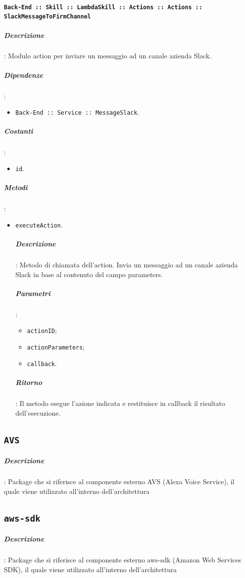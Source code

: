 \documentclass[../DefinizioneDiProdotto_v3.0.0.tex]{subfiles}
\begin{document}
\paragraph{\texttt{Back-End :: Skill :: LambdaSkill :: Actions :: Actions :: SlackMessageToFirmChannel}}
\subparagraph{Descrizione}: Modulo action per inviare un messaggio ad un canale azienda Slack.
\subparagraph{Dipendenze}:
\begin{itemize}
	\item \texttt{Back-End :: Service :: MessageSlack}.
\end{itemize}
\subparagraph{Costanti}:
\begin{itemize}
	\item \texttt{id}.
\end{itemize}
\subparagraph{Metodi}:
\begin{itemize}
	\item \texttt{executeAction}.
	      \subparagraph{Descrizione}: Metodo di chiamata dell'action. Invia un messaggio ad un canale azienda Slack in base al contenuto del campo parameters.
	      \subparagraph{Parametri}:
	      \begin{itemize}
	      	\item \texttt{actionID};
	      	\item \texttt{actionParameters};
	      	\item \texttt{callback}.
	      \end{itemize}
	      \subparagraph{Ritorno}: Il metodo esegue l'azione indicata e restituisce in callback il risultato dell'esecuzione.
\end{itemize}

\subsection{\texttt{AVS}}
	\subparagraph{Descrizione}: Package che si riferisce al componente esterno AVS (Alexa Voice Service), il quale viene utilizzato all'interno dell'architettura

\subsection{\texttt{aws-sdk}}

	\subparagraph{Descrizione}: Package che si riferisce al componente esterno aws-sdk (Amazon Web Services SDK), il quale viene utilizzato all'interno dell'architettura
\end{document}
